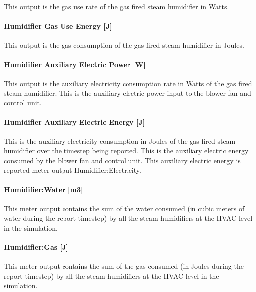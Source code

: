 This output is the gas use rate of the gas fired steam humidifier in Watts.

\paragraph{Humidifier Gas Use Energy {[}J{]}}\label{humidifier-gas-use-energy-j}

This output is the gas consumption of the gas fired steam humidifier in Joules.

\paragraph{Humidifier Auxiliary Electric Power {[}W{]}}\label{humidifier-auxiliary-electric-power-w}

This output is the auxiliary electricity consumption rate in Watts of the gas fired steam humidifier. This is the auxiliary electric power input to the blower fan and control unit.

\paragraph{Humidifier Auxiliary Electric Energy {[}J{]}}\label{humidifier-auxiliary-electric-energy-j}

This is the auxiliary electricity consumption in Joules of the gas fired steam humidifier over the timestep being reported. This is the auxiliary electric energy consumed by the blower fan and control unit. This auxiliary electric energy is reported meter output Humidifier:Electricity.

\paragraph{Humidifier:Water {[}m3{]}}\label{humidifierwater-m3-1}

This meter output contains the sum of the water consumed (in cubic meters of water during the report timestep) by all the steam humidifiers at the HVAC level in the simulation.

\paragraph{Humidifier:Gas {[}J{]}}\label{humidifiergas-j}

This meter output contains the sum of the gas consumed (in Joules during the report timestep) by all the steam humidifiers at the HVAC level in the simulation.

